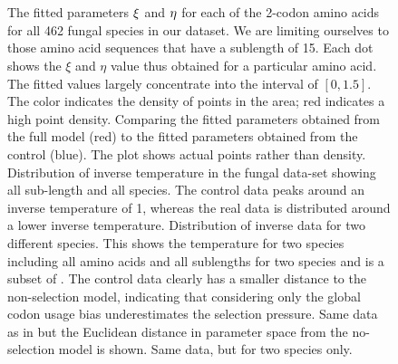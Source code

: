 \documentclass[a4paper,10pt]{paper}%
\begin{document}
\par
%
%
\begin{figure}
\centering
{}
\\
\\
\caption{\protect{} The fitted parameters $\protect\xi$ and $\protect\eta$  for each of the 2-codon amino acids for all 462 fungal species in our dataset. We are  limiting ourselves to those amino acid sequences that have a sublength of 15. Each dot shows the $\xi$ and $\eta$ value thus obtained for a particular amino acid. The fitted values largely concentrate into the interval of $[0,1.5]$.  The color indicates the density of points in the area; red indicates a high point density. \protect{} Comparing the fitted parameters obtained from the full model (red) to the fitted parameters obtained from the control (blue). The plot shows actual points rather than density.  \protect{}  Distribution of inverse temperature in the fungal data-set showing all sub-length and all species. The control data peaks around an inverse temperature of 1, whereas the real data is distributed around a lower inverse temperature. \protect{} Distribution of inverse data for two different species. This shows  the temperature for two species including all amino acids and all sublengths for two species and is a subset of \protect{}. \protect{} The control data clearly has a smaller distance to the non-selection model, indicating that considering only the global codon usage bias underestimates the selection pressure. \protect{} Same data as in \protect{} but the Euclidean distance in parameter space from the no-selection model is shown.  \protect{} Same data, but for two species only. }
\label{fourspecies}
\label{fitresults}
\end{figure}
\end{document}
